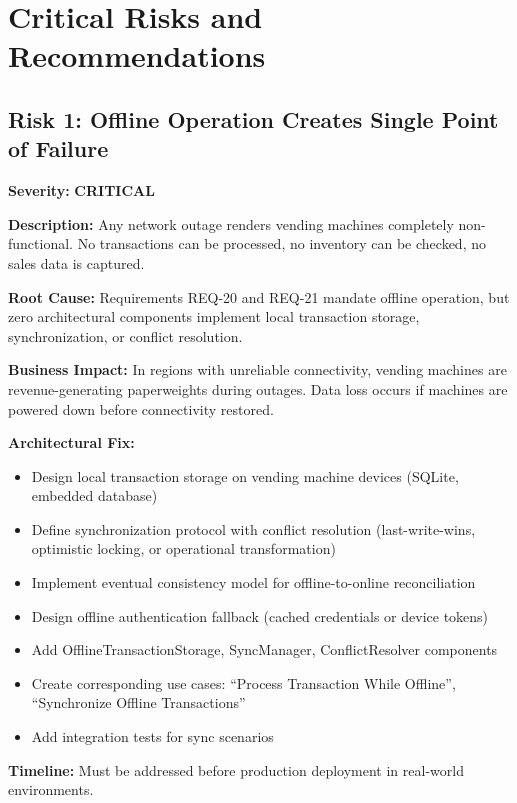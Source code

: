 \documentclass[11pt,a4paper]{article}
\begin{document}
\section{Critical Risks and Recommendations}

\subsection{Risk 1: Offline Operation Creates Single Point of Failure}

\textbf{Severity:} \textbf{CRITICAL}

\textbf{Description:} Any network outage renders vending machines completely non-functional. No transactions can be processed, no inventory can be checked, no sales data is captured.

\textbf{Root Cause:} Requirements REQ-20 and REQ-21 mandate offline operation, but zero architectural components implement local transaction storage, synchronization, or conflict resolution.

\textbf{Business Impact:} In regions with unreliable connectivity, vending machines are revenue-generating paperweights during outages. Data loss occurs if machines are powered down before connectivity restored.

\textbf{Architectural Fix:}
\begin{itemize}
    \item Design local transaction storage on vending machine devices (SQLite, embedded database)
    \item Define synchronization protocol with conflict resolution (last-write-wins, optimistic locking, or operational transformation)
    \item Implement eventual consistency model for offline-to-online reconciliation
    \item Design offline authentication fallback (cached credentials or device tokens)
    \item Add OfflineTransactionStorage, SyncManager, ConflictResolver components
    \item Create corresponding use cases: ``Process Transaction While Offline'', ``Synchronize Offline Transactions''
    \item Add integration tests for sync scenarios
\end{itemize}

\textbf{Timeline:} Must be addressed before production deployment in real-world environments.
\end{document}
